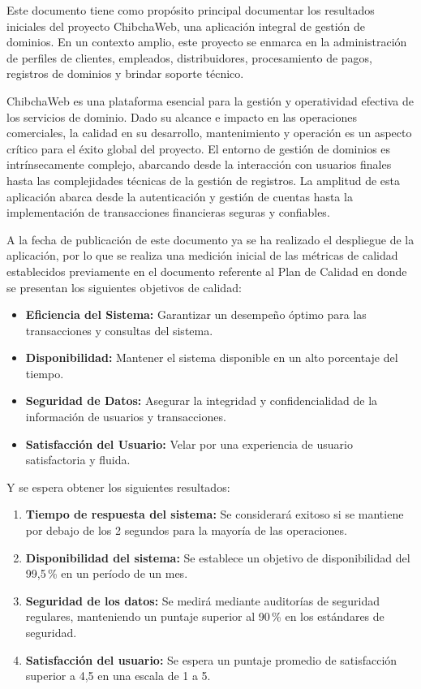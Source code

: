 \documentclass[12pt,a4paper]{article}
\begin{document}
Este documento tiene como propósito principal documentar los resultados iniciales del
proyecto ChibchaWeb, una aplicación integral de gestión de dominios. En un contexto
amplio, este proyecto se enmarca en la administración de perfiles de clientes, empleados,
distribuidores, procesamiento de pagos, registros de dominios y brindar soporte técnico.

ChibchaWeb es una plataforma esencial para la gestión y operatividad efectiva de los
servicios de dominio. Dado su alcance e impacto en las operaciones comerciales, la calidad
en su desarrollo, mantenimiento y operación es un aspecto crítico para el éxito global del
proyecto. El entorno de gestión de dominios es intrínsecamente complejo, abarcando desde la
interacción con usuarios finales hasta las complejidades técnicas de la gestión de registros. La
amplitud de esta aplicación abarca desde la autenticación y gestión de cuentas hasta la
implementación de transacciones financieras seguras y confiables.

A la fecha de publicación de este documento ya se ha realizado el despliegue de la aplicación,
por lo que se realiza una medición inicial de las métricas de calidad establecidos previamente
en el documento referente al Plan de Calidad en donde se presentan los siguientes objetivos de
calidad:

\begin{itemize}
  \item \textbf{Eficiencia del Sistema:} Garantizar un desempeño óptimo para las transacciones y
        consultas del sistema.
  \item \textbf{Disponibilidad:} Mantener el sistema disponible en un alto porcentaje del tiempo.
  \item \textbf{Seguridad de Datos:} Asegurar la integridad y confidencialidad de la información
        de usuarios y transacciones.
  \item \textbf{Satisfacción del Usuario:} Velar por una experiencia de usuario satisfactoria y
        fluida.
\end{itemize}

Y se espera obtener los siguientes resultados:

\begin{enumerate}
  \item \textbf{Tiempo de respuesta del sistema:} Se considerará exitoso si se mantiene por debajo
        de los 2 segundos para la mayoría de las operaciones.
  \item \textbf{Disponibilidad del sistema:} Se establece un objetivo de disponibilidad del 99,5\,\% en
        un período de un mes.
  \item \textbf{Seguridad de los datos:} Se medirá mediante auditorías de seguridad regulares,
        manteniendo un puntaje superior al 90\,\% en los estándares de seguridad.
  \item \textbf{Satisfacción del usuario:} Se espera un puntaje promedio de satisfacción superior a
        4,5 en una escala de 1 a 5.
\end{enumerate}
\end{document}

